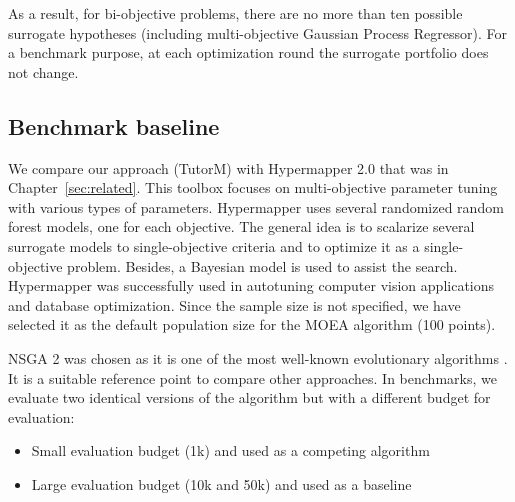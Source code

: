     As a result, for bi-objective problems, there are no more than ten possible surrogate hypotheses (including multi-objective Gaussian Process Regressor). For a benchmark purpose, at each optimization round the surrogate portfolio does not change. 

    \subsection{Benchmark baseline}
    We compare our approach (TutorM) with Hypermapper 2.0\cite{nardi2019practical} that was in Chapter~\ref{sec:related}. This toolbox focuses on multi-objective parameter tuning with various types of parameters. Hypermapper uses several randomized random forest models, one for each objective. The general idea is to scalarize several surrogate models to single-objective criteria and to optimize it as a single-objective problem. Besides, a Bayesian model is used to assist the search. Hypermapper was successfully used in autotuning computer vision applications and database optimization. Since the sample size is not specified, we have selected it as the default population size for the MOEA algorithm (100 points).

    NSGA 2 was chosen as it is one of the most well-known evolutionary algorithms \cite{RamirezRV19}. It is a suitable reference point to compare other approaches. In benchmarks, we evaluate two identical versions of the algorithm but with a different budget for evaluation:
        \begin{itemize}
            \item Small evaluation budget (1k) and used as a competing algorithm
            \item Large evaluation budget (10k and 50k) and used as a baseline
        \end{itemize}





